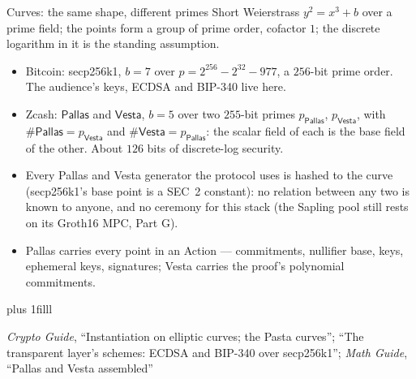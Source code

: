 \documentclass[aspectratio=169,11pt]{beamer}
\newcommand{\Pallas}{\ensuremath{\mathsf{Pallas}}}
\newcommand{\Vesta}{\ensuremath{\mathsf{Vesta}}}
\newcommand{\src}[1]{\par\vskip0pt plus 1filll
  {\fontsize{6}{7.2}\selectfont\color{arbdim}\raggedright #1\par}}
\begin{document}
\begin{frame}{Curves: the same shape, different primes}
Short Weierstrass $y^{2} = x^{3} + b$ over a prime field; the points form a
group of prime order, cofactor $1$; the discrete logarithm in it is the
standing assumption.
\begin{itemize}
  \item Bitcoin: secp256k1, $b = 7$ over $p = 2^{256} - 2^{32} - 977$, a
    $256$-bit prime order. The audience's keys, ECDSA and BIP-340 live here.
  \item Zcash: \Pallas{} and \Vesta{}, $b = 5$ over two $255$-bit primes
    $p_{\Pallas}$, $p_{\Vesta}$, with $\#\Pallas = p_{\Vesta}$ and
    $\#\Vesta = p_{\Pallas}$: the scalar field of each is the base field of
    the other. About $126$ bits of discrete-log security.
  \item Every Pallas and Vesta generator the protocol uses is hashed to
    the curve (secp256k1's base point is a SEC~2 constant): no relation
    between any two is known to anyone, and no ceremony for this stack
    (the Sapling pool still rests on its Groth16 MPC, Part G).
  \item Pallas carries every point in an Action --- commitments, nullifier
    base, keys, ephemeral keys, signatures; Vesta carries the proof's
    polynomial commitments.
\end{itemize}
\src{\emph{Crypto Guide}, ``Instantiation on elliptic curves; the Pasta
  curves''; ``The transparent layer's schemes: ECDSA and BIP-340 over
  secp256k1''; \emph{Math Guide}, ``Pallas and Vesta assembled''}
\end{frame}
\end{document}
